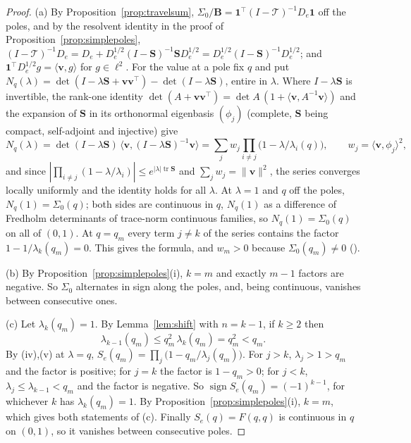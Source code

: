 \documentclass[11pt]{article}
\theoremstyle{plain}
\theoremstyle{definition}
\theoremstyle{remark}
\begin{document}
\begin{proof}
(a) By Proposition~\ref{prop:travelsum}, $\Sigma_0/\mathbf B=\mathbf 1^{\!\top}(I-\mathcal
T)^{-1}D_e\mathbf 1$ off the poles, and by the resolvent identity in the proof of
Proposition~\ref{prop:simplepoles},
$(I-\mathcal T)^{-1}D_e=D_e+D_e^{1/2}(I-\mathbf S)^{-1}\mathbf SD_e^{1/2}
=D_e^{1/2}(I-\mathbf S)^{-1}D_e^{1/2}$; and $\mathbf 1^{\!\top}D_e^{1/2}g=\langle\mathbf v,g\rangle$
for $g\in\ell^2$. For the value at a pole fix $q$ and put
$N_q(\lambda)=\det(I-\lambda\mathbf S+\mathbf v\mathbf v^{\!\top})-\det(I-\lambda\mathbf S)$, entire
in $\lambda$. Where $I-\lambda\mathbf S$ is invertible, the rank-one identity
$\det(A+\mathbf v\mathbf v^{\!\top})=\det A\,(1+\langle\mathbf v,A^{-1}\mathbf v\rangle)$ and the
expansion of $\mathbf S$ in its orthonormal eigenbasis $(\phi_j)$ (complete, $\mathbf S$ being
compact, self-adjoint and injective) give
\[
   N_q(\lambda)=\det(I-\lambda\mathbf S)\,\langle\mathbf v,(I-\lambda\mathbf S)^{-1}\mathbf v\rangle
   =\sum_jw_j\prod_{i\ne j}\bigl(1-\lambda/\lambda_i(q)\bigr),\qquad
   w_j=\langle\mathbf v,\phi_j\rangle^2 ,
\]
and since $|\prod_{i\ne j}(1-\lambda/\lambda_i)|\le e^{|\lambda|\operatorname{tr}\mathbf S}$ and
$\sum_jw_j=\|\mathbf v\|^2$, the series converges locally uniformly and the identity holds for all
$\lambda$. At $\lambda=1$ and $q$ off the poles, $N_q(1)=\Sigma_0(q)$; both sides are continuous in
$q$, $N_q(1)$ as a difference of Fredholm determinants of trace-norm continuous families, so
$N_q(1)=\Sigma_0(q)$ on all of $(0,1)$. At $q=q_m$ every term $j\ne k$ of the series contains the
factor $1-1/\lambda_k(q_m)=0$. This gives the formula, and $w_m>0$ because $\Sigma_0(q_m)\ne0$
({\cite[Proposition ``the numerators do not vanish at the travel poles'', \textup{prop:numnonvanish}]{Bonfioli2026bA}}).

(b) By Proposition~\ref{prop:simplepoles}\textup{(i)}, $k=m$ and exactly $m-1$ factors are negative.
So $\Sigma_0$ alternates in sign along the poles, and, being continuous, vanishes between
consecutive ones.

(c) Let $\lambda_k(q_m)=1$. By Lemma~\ref{lem:shift} with $n=k-1$, if $k\ge2$ then
\[
   \lambda_{k-1}(q_m)\le q_m^2\,\lambda_k(q_m)=q_m^2<q_m .
\]
By {\cite[Theorem ``the travel determinant'', \textup{thm:fredholm}]{Bonfioli2026bA}}\textup{(iv)},\textup{(v)} at $\lambda=q$,
$S_e(q_m)=\prod_j\bigl(1-q_m/\lambda_j(q_m)\bigr)$. For $j>k$, $\lambda_j>1>q_m$ and the factor is
positive; for $j=k$ the factor is $1-q_m>0$; for $j<k$, $\lambda_j\le\lambda_{k-1}<q_m$ and the factor
is negative. So $\operatorname{sign}S_e(q_m)=(-1)^{k-1}$, for whichever $k$ has $\lambda_k(q_m)=1$.
By Proposition~\ref{prop:simplepoles}\textup{(i)}, $k=m$, which gives both statements of (c).
Finally $S_e(q)=F(q,q)$ is continuous in $q$ on $(0,1)$, so it vanishes between consecutive poles.
\end{proof}
\end{document}
